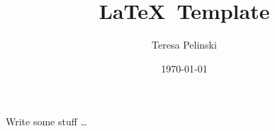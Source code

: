 \title{\LaTeX~Template}
\author{Teresa Pelinski}
\date{\getDate\today}
\maketitle


\noindent Write some stuff \dots